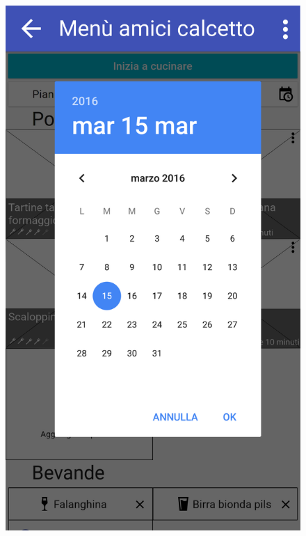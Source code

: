 \begin{figure}[H]
\begin{minipage}{.49\textwidth}
	\end{minipage}
	\begin{minipage}{.49\textwidth}
		\includegraphics[width=\textwidth]{img/wireframe/men_amici_calcetto_calendario.png}
	\end{minipage}
\end{figure}
